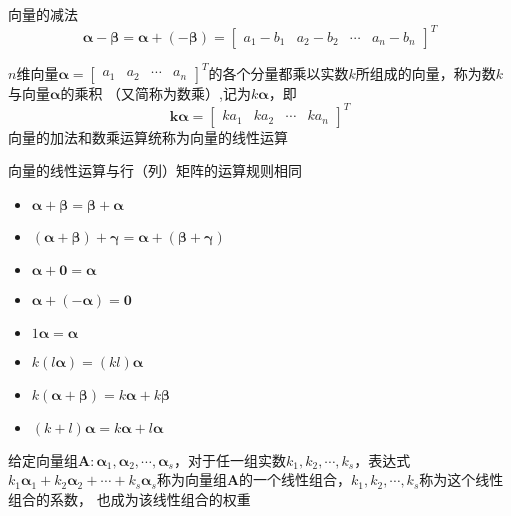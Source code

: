 \documentclass[UTF8]{ctexart}
\newcommand{\ve}[1]{{\bm{#1}}}
\newcommand{\mat}[1]{\ve{#1}}
\newcommand{\emplin}{\vspace{1em}}
\begin{document}
向量的减法
\[\mat{\alpha}-\mat{\beta}=\mat{\alpha}+(-\mat{\beta})=\begin{bmatrix}a_1-b_1&a_2-b_2&\cdots&a_n-b_n\end{bmatrix}^T\]

\emplin

$n$维向量$\mat{\alpha}=\begin{bmatrix}a_1&a_2&\cdots&a_n\end{bmatrix}^T$的各个分量都乘以实数$k$所组成的向量，称为数$k$与向量$\mat{\alpha}$的乘积
（又简称为数乘）,记为$k\mat{\alpha}$，即\[\mat{k\alpha}=\begin{bmatrix}ka_1&ka_2&\cdots&ka_n\end{bmatrix}^T\]
向量的加法和数乘运算统称为向量的线性运算

\emplin

向量的线性运算与行（列）矩阵的运算规则相同
\begin{itemize}
  \item $\mat{\alpha}+\mat{\beta}=\mat{\beta}+\mat{\alpha}$
  \item $(\mat{\alpha}+\mat{\beta})+\mat{\gamma}=\mat{\alpha}+(\mat{\beta}+\mat{\gamma})$
  \item $\mat{\alpha}+\mat{0}=\mat{\alpha}$
  \item $\mat{\alpha}+(-\mat{\alpha})=\mat{0}$
  \item $1\mat{\alpha}=\mat{\alpha}$
  \item $k(l\mat{\alpha})=(kl)\mat{\alpha}$
  \item $k(\mat{\alpha}+\mat{\beta})=k\mat{\alpha}+k\mat{\beta}$
  \item $(k+l)\mat{\alpha}=k\mat{\alpha}+l\mat{\alpha}$
\end{itemize}

\emplin

给定向量组$\mat{A}:\mat{\alpha}_1,\mat{\alpha}_2,\cdots,\mat{\alpha}_s$，对于任一组实数$k_1,k_2,\cdots,k_s$，表达式
$k_1\mat{\alpha}_1+k_2\mat{\alpha}_2+\cdots+k_s\mat{\alpha}_s$称为向量组$\mat{A}$的一个线性组合，$k_1,k_2,\cdots,k_s$称为这个线性组合的系数，
也成为该线性组合的权重
\end{document}
